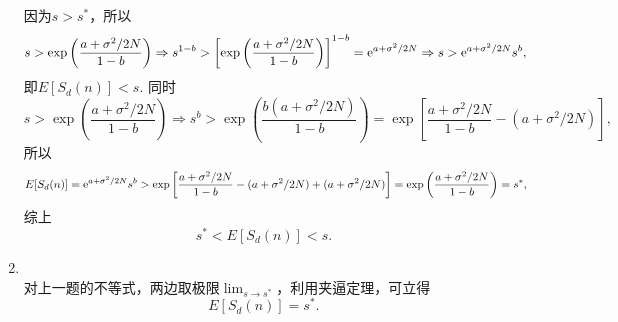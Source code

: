\begin{enumerate}[label=\arabic{section}.\arabic*]
    因为$s>s^*$，所以
    \[s>\exp\left(\frac{a+\sigma^2/2N}{1-b}\right) \Rightarrow s^{1-b} > \left[\exp\left(\frac{a+\sigma^2/2N}{1-b}\right)\right]^{1-b}=\mathrm{e}^{a+\sigma^2/2N} \Rightarrow s>\mathrm{e}^{a+\sigma^2/2N}s^b,\]
    即$E[S_d(n)]<s$. 同时
    \[s>\exp\left(\frac{a+\sigma^2/2N}{1-b}\right) \Rightarrow s^b > \exp\left(\frac{b(a+\sigma^2/2N)}{1-b}\right)=\exp\left[\frac{a+\sigma^2/2N}{1-b} - (a+\sigma^2/2N)\right],\]
    所以\[E[S_d(n)]=\mathrm{e}^{a+\sigma^2/2N}s^b>\exp\left[\frac{a+\sigma^2/2N}{1-b} - (a+\sigma^2/2N)+(a+\sigma^2/2N)\right]=\exp\left(\frac{a+\sigma^2/2N}{1-b}\right)=s^*,\]
    综上\[s^* < E[S_d(n)] < s.\]
    \item \pro\\
    对上一题的不等式，两边取极限$\displaystyle \lim_{s \to s^*}$，利用夹逼定理，可立得\[E[S_d(n)]=s^*.\]
\end{enumerate}
\clearpage